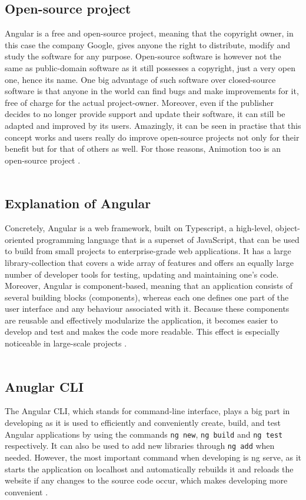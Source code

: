 \subsection{Open-source project}
Angular is a free and open-source project, meaning that the copyright owner, in this case the company Google,
gives anyone the right to distribute, modify and study the software for any purpose. Open-source software is 
however not the same as public-domain software as it still possesses a copyright, just a very open one, hence its name. 
One big advantage of such software over closed-source software is that anyone in the world can find bugs and make 
improvements for it, free of charge for the actual project-owner. Moreover, even if the publisher decides to no longer 
provide support and update their software, it can still be adapted and improved by its users. Amazingly, it can be seen 
in practise that this concept works and users really do improve open-source projects not only for their benefit but for 
that of others as well. For those reasons, Animotion too is an open-source project \cite{Opensource}.
\\
\\
\subsection{Explanation of Angular}
Concretely, Angular is a web framework, built on Typescript, a high-level, object-oriented programming language that is 
a superset of JavaScript, that can be used to build from small projects to enterprise-grade web applications. It has a 
large library-collection that covers a wide array of features and offers an equally large number of developer tools for 
testing, updating and maintaining one's code. Moreover, Angular is component-based, meaning that an application consists 
of several building blocks (components), whereas each one defines one part of the user interface and any behaviour associated 
with it. Because these components are reusable and effectively modularize the application, it becomes easier to develop and 
test and makes the code more readable. This effect is especially noticeable in large-scale projects \cite{AngularDescription}.
\\
\\
\subsection{Anuglar CLI}
The Angular CLI, which stands for command-line interface, plays a big part in developing as it is used to efficiently and 
conveniently create, build, and test Angular applications by using the commands \texttt{ng new}, \texttt{ng build}
and \texttt{ng test} respectively. It can also be used to add new libraries through \texttt{ng add}
when needed. However, the most important command when developing is ng serve, as it starts the application on 
localhost and automatically rebuilds it and reloads the website if any changes to the source code occur, which makes 
developing more convenient \cite{AngularCLI}.
\\
\\
